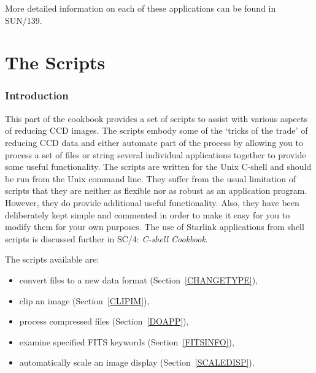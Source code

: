 \documentclass[twoside,11pt]{article}
\newcommand{\stardocinitials}  {SC}
\newcommand{\stardocnumber}    {5.3}
\newcommand{\stardocname}{\stardocinitials /\stardocnumber}
\newcommand{\xref}[3]{#1}
\newcommand{\xlabel}[1]{}
\begin{document}
More detailed information on each of these applications can be found in 
\xref{SUN/139}{sun139}{}\/\cite{SUN139}.


\cleardoublepage
\markboth{\stardocname}{\stardocname}
\part{The Scripts}
\markboth{\stardocname}{\stardocname}
\section{\xlabel{SUMSC}\label{SUMSC}Introduction}

This part of the cookbook provides a set of scripts to assist with
various aspects of reducing CCD images.  The scripts embody some of the
`tricks of the trade' of reducing CCD data and either automate part of
the process by allowing you to process a set of files or string several
individual applications together to provide some useful functionality.
The scripts are written for the Unix C-shell and should be run from the
Unix command line.  They suffer from the usual limitation of scripts
that they are neither as flexible nor as robust as an application program.
However, they do provide additional useful functionality.  Also, they
have been deliberately kept simple and commented in order to make it
easy for you to  modify them for your own purposes.  The use of Starlink
applications from shell scripts is discussed further in \xref{SC/4:
{\it C-shell Cookbook}\/}{sc4}{}\cite{SC4}.

The scripts available are:

\begin{itemize}

  \item convert files to a new data format (Section~\ref{CHANGETYPE}),

  \item clip an image (Section~\ref{CLIPIM}),

  \item process compressed files (Section~\ref{DOAPP}),

  \item examine specified FITS keywords (Section~\ref{FITSINFO}),

  \item automatically scale an image display (Section~\ref{SCALEDISP}).

\end{itemize}
\end{document}

